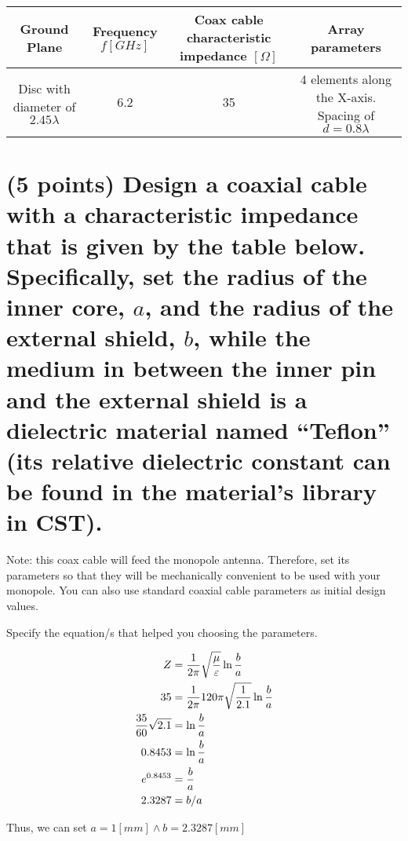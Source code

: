 \documentclass[12pt, letterpaper]{article}
\begin{document}
\vspace{2em}
\begin{tabular}{| c | c | c | c |}
  \hline
  Ground Plane & Frequency $f[GHz]$ & \shortstack{Coax cable \\ characteristic impedance $[\Omega]$} & Array parameters\\
  \hline
  \shortstack{Disc with \\ diameter of $2.45\lambda$} & 6.2 & 35 & \shortstack{4 elements along the X-axis.\\ Spacing of $d=0.8\lambda$}\\
  \hline
\end{tabular}

\pagebreak


\section{(5 points) Design a coaxial cable with a characteristic impedance that is given by the table below. Specifically, set the radius of the inner core, $a$, and the radius of the external shield, $b$, while the medium in between the inner pin and the external shield is a dielectric material named “Teflon” (its relative dielectric constant can be found in the material's library in CST).}

Note: this coax cable will feed the monopole antenna. Therefore, set its parameters so that they
will be mechanically convenient to be used with your monopole. You can also use standard
coaxial cable parameters as initial design values.

Specify the equation/s that helped you choosing the parameters.

\begin{align}
  Z
  &=
  {
    1
    \over
    2\pi
  }
  \sqrt{
    \mu
    \over
    \varepsilon
  }
  \ln{b\over a}
  \\
  35
  &=
  {
    1
    \over
    2\pi
  }
  120\pi
  \sqrt{
    1
    \over
    2.1
  }
  \ln{b\over a}
  \\
  {
    35
    \over
    60
  }
  \sqrt{2.1}
  &=
  \ln{b\over a}
  \\
  0.8453
  &=
  \ln{b\over a}
  \\
  e^{0.8453}
  &=
  {b\over a}
  \\
  2.3287
  &=
  b/a
\end{align}

\vspace{0.5em}

\begin{center}
  Thus, we can set $a=1[mm]\wedge b=2.3287[mm]$
\end{center}
\end{document}
